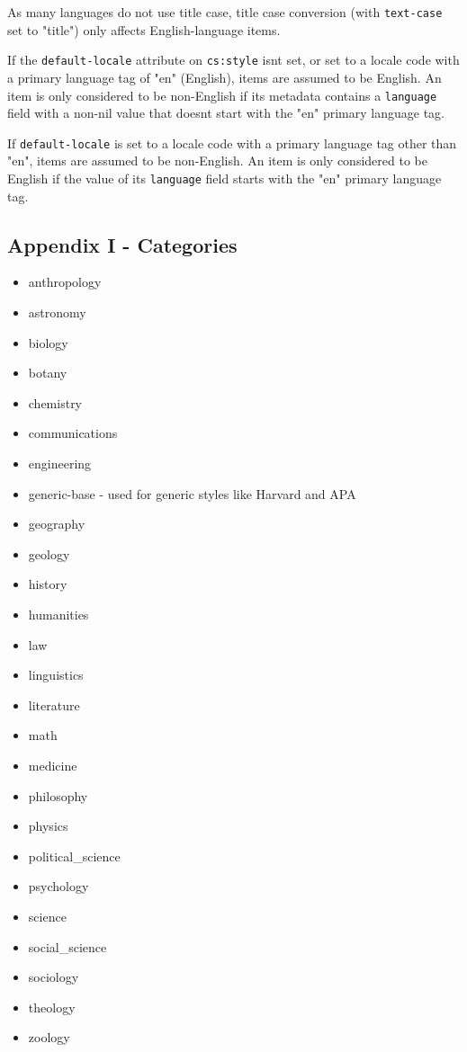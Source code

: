 As many languages do not use title case, title case conversion (with
\texttt{text-case} set to "title") only affects English-language items.

If the \texttt{default-locale} attribute on \texttt{cs:style}
isn\textquotesingle t set, or set to a locale code with a primary
language tag of "en" (English), items are assumed to be English. An item
is only considered to be non-English if its metadata contains a
\texttt{language} field with a non-nil value that
doesn\textquotesingle t start with the "en" primary language tag.

If \texttt{default-locale} is set to a locale code with a primary
language tag other than "en", items are assumed to be non-English. An
item is only considered to be English if the value of its
\texttt{language} field starts with the "en" primary language tag.

\hypertarget{appendix-i---categories}{%
\subsection{Appendix I - Categories}\label{appendix-i---categories}}

\begin{itemize}
\tightlist
\item
  anthropology
\item
  astronomy
\item
  biology
\item
  botany
\item
  chemistry
\item
  communications
\item
  engineering
\item
  generic-base - used for generic styles like Harvard and APA
\item
  geography
\item
  geology
\item
  history
\item
  humanities
\item
  law
\item
  linguistics
\item
  literature
\item
  math
\item
  medicine
\item
  philosophy
\item
  physics
\item
  political\_science
\item
  psychology
\item
  science
\item
  social\_science
\item
  sociology
\item
  theology
\item
  zoology
\end{itemize}

